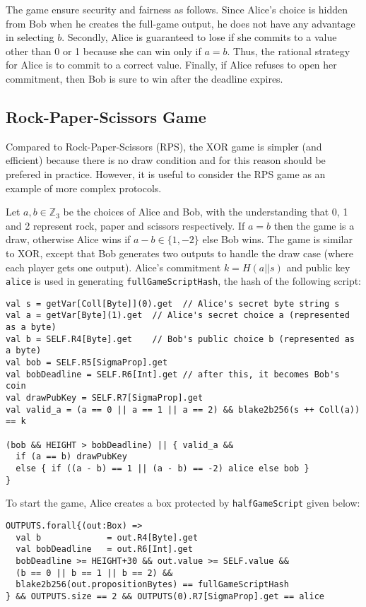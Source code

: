 \documentclass[11pt]{article}
\begin{document}
The game ensure security and fairness as follows. Since Alice's choice is hidden from Bob when he creates the full-game output, he does not have any advantage in selecting $b$. Secondly, Alice is guaranteed to lose if she commits to a value other than 0 or 1 because she can win only if $a = b$. 
Thus, the rational strategy for Alice is to commit to a correct value. Finally, if Alice refuses to open her commitment, then Bob is sure to win after the deadline expires. 

\subsection{Rock-Paper-Scissors Game}

Compared to Rock-Paper-Scissors (RPS), the XOR game is simpler (and efficient) because there is no draw condition and for this reason should be prefered in practice. However, it is useful to consider the RPS game as an example of more complex protocols.

Let $a, b\in \mathbb{Z}_3$ be the choices of Alice and Bob, with the understanding that 0, 1 and 2 represent rock, paper and scissors respectively. If $a = b$ then the game is a draw, otherwise Alice wins if $a-b \in \{1, -2\}$ else Bob wins. The game is similar to XOR, except that Bob generates two outputs to handle the draw case (where each player gets one output). 
Alice's commitment $k=H(a||s)$ and public key \texttt{alice} is used in generating \texttt{fullGameScriptHash}, the hash of the following script:

\begin{verbatim}
val s = getVar[Coll[Byte]](0).get  // Alice's secret byte string s
val a = getVar[Byte](1).get  // Alice's secret choice a (represented as a byte)
val b = SELF.R4[Byte].get    // Bob's public choice b (represented as a byte)
val bob = SELF.R5[SigmaProp].get
val bobDeadline = SELF.R6[Int].get // after this, it becomes Bob's coin
val drawPubKey = SELF.R7[SigmaProp].get
val valid_a = (a == 0 || a == 1 || a == 2) && blake2b256(s ++ Coll(a)) == k

(bob && HEIGHT > bobDeadline) || { valid_a &&
  if (a == b) drawPubKey
  else { if ((a - b) == 1 || (a - b) == -2) alice else bob }
}
\end{verbatim}

To start the game, Alice creates a box protected by \texttt{halfGameScript} given below:

\begin{verbatim}
OUTPUTS.forall{(out:Box) =>
  val b             = out.R4[Byte].get
  val bobDeadline   = out.R6[Int].get
  bobDeadline >= HEIGHT+30 && out.value >= SELF.value &&
  (b == 0 || b == 1 || b == 2) && 
  blake2b256(out.propositionBytes) == fullGameScriptHash
} && OUTPUTS.size == 2 && OUTPUTS(0).R7[SigmaProp].get == alice 
\end{verbatim}
\end{document}
